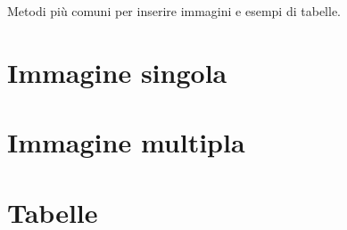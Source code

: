 Metodi più comuni per inserire immagini e esempi di tabelle.

\section{Immagine singola}


\section{Immagine multipla}


\section{Tabelle}
